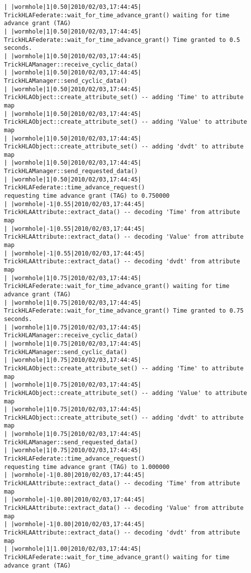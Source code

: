 \begin{lstlisting}[numbers=none,caption={output showing conditionally sent cyclic data}]
| |wormhole|1|0.50|2010/02/03,17:44:45| TrickHLAFederate::wait_for_time_advance_grant() waiting for time advance grant (TAG)
| |wormhole|1|0.50|2010/02/03,17:44:45| TrickHLAFederate::wait_for_time_advance_grant() Time granted to 0.5 seconds.
| |wormhole|1|0.50|2010/02/03,17:44:45| TrickHLAManager::receive_cyclic_data()
| |wormhole|1|0.50|2010/02/03,17:44:45| TrickHLAManager::send_cyclic_data()
| |wormhole|1|0.50|2010/02/03,17:44:45| TrickHLAObject::create_attribute_set() -- adding 'Time' to attribute map
| |wormhole|1|0.50|2010/02/03,17:44:45| TrickHLAObject::create_attribute_set() -- adding 'Value' to attribute map
| |wormhole|1|0.50|2010/02/03,17:44:45| TrickHLAObject::create_attribute_set() -- adding 'dvdt' to attribute map
| |wormhole|1|0.50|2010/02/03,17:44:45| TrickHLAManager::send_requested_data()
| |wormhole|1|0.50|2010/02/03,17:44:45| TrickHLAFederate::time_advance_request()   
requesting time advance grant (TAG) to 0.750000
| |wormhole|-1|0.55|2010/02/03,17:44:45| TrickHLAAttribute::extract_data() -- decoding 'Time' from attribute map
| |wormhole|-1|0.55|2010/02/03,17:44:45| TrickHLAAttribute::extract_data() -- decoding 'Value' from attribute map
| |wormhole|-1|0.55|2010/02/03,17:44:45| TrickHLAAttribute::extract_data() -- decoding 'dvdt' from attribute map
| |wormhole|1|0.75|2010/02/03,17:44:45| TrickHLAFederate::wait_for_time_advance_grant() waiting for time advance grant (TAG)
| |wormhole|1|0.75|2010/02/03,17:44:45| TrickHLAFederate::wait_for_time_advance_grant() Time granted to 0.75 seconds.
| |wormhole|1|0.75|2010/02/03,17:44:45| TrickHLAManager::receive_cyclic_data()
| |wormhole|1|0.75|2010/02/03,17:44:45| TrickHLAManager::send_cyclic_data()
| |wormhole|1|0.75|2010/02/03,17:44:45| TrickHLAObject::create_attribute_set() -- adding 'Time' to attribute map
| |wormhole|1|0.75|2010/02/03,17:44:45| TrickHLAObject::create_attribute_set() -- adding 'Value' to attribute map
| |wormhole|1|0.75|2010/02/03,17:44:45| TrickHLAObject::create_attribute_set() -- adding 'dvdt' to attribute map
| |wormhole|1|0.75|2010/02/03,17:44:45| TrickHLAManager::send_requested_data()
| |wormhole|1|0.75|2010/02/03,17:44:45| TrickHLAFederate::time_advance_request()   
requesting time advance grant (TAG) to 1.000000
| |wormhole|-1|0.80|2010/02/03,17:44:45| TrickHLAAttribute::extract_data() -- decoding 'Time' from attribute map
| |wormhole|-1|0.80|2010/02/03,17:44:45| TrickHLAAttribute::extract_data() -- decoding 'Value' from attribute map
| |wormhole|-1|0.80|2010/02/03,17:44:45| TrickHLAAttribute::extract_data() -- decoding 'dvdt' from attribute map
| |wormhole|1|1.00|2010/02/03,17:44:45| TrickHLAFederate::wait_for_time_advance_grant() waiting for time advance grant (TAG)

\end{lstlisting}
